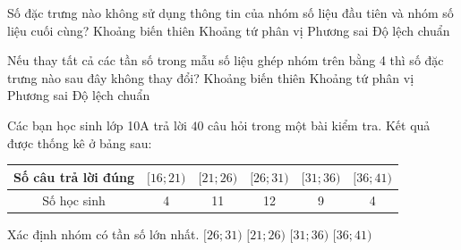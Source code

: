 

\begin{ex}%
	Số đặc trưng nào không sử dụng thông tin của nhóm số liệu đầu tiên  và nhóm số liệu cuối cùng?
	\choice 
		{Khoảng biến thiên} 
		 {\True Khoảng tứ phân vị}
		{Phương  sai}
		{Độ lệch chuẩn} 
\end{ex}

\begin{ex}%
	Nếu thay tất cả các tần số trong mẫu số liệu ghép nhóm trên bằng 4 thì số đặc trưng nào  sau đây không thay đổi?
	 \choice
		{\True  Khoảng biến thiên}
		{Khoảng tứ phân vị} 
		{Phương  sai}
		{Độ lệch chuẩn} 
\end{ex}

\begin{ex}%
	Các bạn học sinh lớp 10A  trả lời $40$ câu hỏi trong một bài kiểm tra. Kết quả được thống kê ở bảng sau:
	\begin{center}
		\begin{tabular}{|c|c|c|c|c|c|}
			 \hline
			Số câu trả lời đúng & {$[16; 21)$} & {$[21; 26)$} & {$[26; 31)$} & {$[31;  36)$} & {$[36; 41)$} \\
			 \hline
			Số học sinh & 4 &  11 & 12 & 9 & 4 \\
			 \hline
		\end{tabular}
	\end{center}
	Xác định  nhóm có tần số lớn nhất.
	\choice 
		{\True $[26;  31)$}
		{$[21;  26)$}
		 {$[31; 36)$}
		{$[36;  41)$}
	\loigiai{ 
		Nhóm có tần  số lớn nhất là $[26; 31)$.
	 }
\end{ex}



